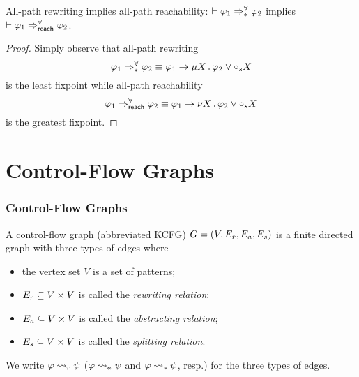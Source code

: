 \documentclass{beamer}
\begin{document}
\begin{frame}
\begin{lemma}
All-path rewriting implies all-path reachability:
$\vdash \varphi_1 \Rightarrow^{\forall}_{*} \varphi_2$ implies
$\vdash \varphi_1 \Rightarrow_\mathsf{reach}^\forall \varphi_2$.
\end{lemma}
\begin{proof}
Simply observe that all-path rewriting
\[\varphi_1 \Rightarrow^{\forall}_{*} \varphi_2 \equiv
       \varphi_1 \rightarrow \mu X \,.\, \varphi_2 \lor \mathord{\circ}_s X\]
is the least fixpoint while
all-path reachability 
\[\varphi_1 \Rightarrow_\mathsf{reach}^\forall \varphi_2 \equiv
       \varphi_1 \rightarrow \nu X \,.\, \varphi_2 \lor \mathord{\circ}_s X\]
is the greatest fixpoint. 
\end{proof}
\end{frame}

\section{\K Control-Flow Graphs}

\begin{frame}
\frametitle{\K Control-Flow Graphs}
\begin{definition}
A \K control-flow graph (abbreviated KCFG) $G = (V, E_r, E_a, E_s)$ is a finite directed graph
with three types of edges where
\begin{itemize}
\item the vertex set $V$ is a set of patterns;
\item $E_r \subseteq V \times V$ is called the \emph{rewriting relation};
\item $E_a \subseteq V \times V$ is called the \emph{abstracting relation};
\item $E_s \subseteq V \times V$ is called the \emph{splitting relation}. 
\end{itemize}
We write $\varphi \rightsquigarrow_r \psi$ 
($\varphi \rightsquigarrow_a \psi$ and $\varphi \rightsquigarrow_s \psi$, resp.)
for the three types of edges.
\end{definition}
\end{frame}
\end{document}
